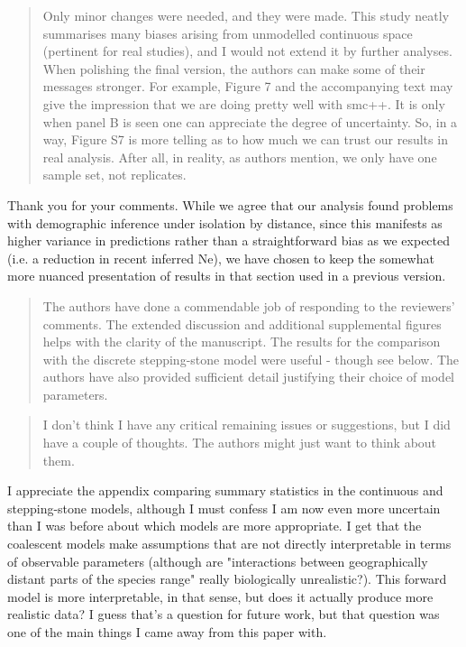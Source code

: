 

\begin{quote}
Only minor changes were needed, and they were made. This study neatly summarises many biases arising from unmodelled continuous space (pertinent for real studies), and I would not extend it by further analyses. When polishing the final version, the authors can make some of their messages stronger. For example, Figure 7 and the accompanying text may give the impression that we are doing pretty well with smc++. It is only when panel B is seen one can appreciate the degree of uncertainty. So, in a way, Figure S7 is more telling as to how much we can trust our results in real analysis. After all, in reality, as authors mention, we only have one sample set, not replicates.
\end{quote}

Thank you for your comments. While we agree that our analysis found problems with demographic inference under isolation by distance, since this manifests as higher variance in predictions rather than a straightforward bias as we expected (i.e. a reduction in recent inferred Ne), we have chosen to keep the somewhat more nuanced presentation of results in that section used in a previous version. 



\begin{quote}
The authors have done a commendable job of responding to the reviewers' comments. The extended discussion and additional supplemental figures helps with the clarity of the manuscript. The results for the comparison with the discrete stepping-stone model were useful - though see below. The authors have also provided sufficient detail justifying their choice of model parameters.
\end{quote}

\begin{quote}
I don't think I have any critical remaining issues or suggestions, but I did have a couple of thoughts. The authors might just want to think about them.
\end{quote}

\begin{point}{}
I appreciate the appendix comparing summary statistics in the continuous and stepping-stone models, although I must confess I am now even more uncertain than I was before about which models are more appropriate. I get that the coalescent models make assumptions that are not directly interpretable in terms of observable parameters (although are "interactions between geographically distant parts of the species range" really biologically unrealistic?). This forward model is more interpretable, in that sense, but does it actually produce more realistic data? I guess that's a question for future work, but that question was one of the main things I came away from this paper with.
\end{point}


